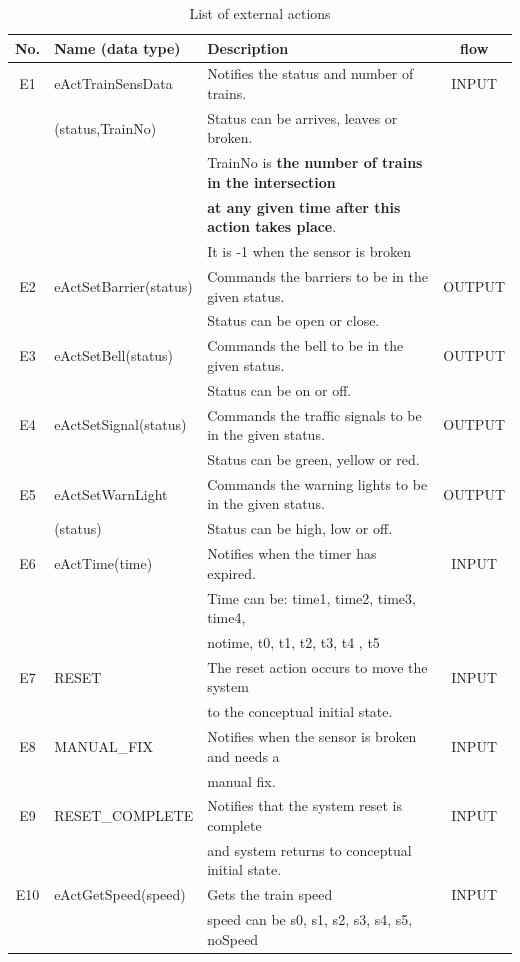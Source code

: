 \documentclass[10pt,a4paper]{article}
\begin{document}
\begin{table}[!hbp]
	\centering
	\begin{adjustwidth}{-1.5cm}{}
	\begin{tabular}{|c|l|l|c|}
		\hline 
		\textbf{No.} & \textbf{Name (data type)
        }&\textbf{Description} & \textbf{flow} \\
		\hline
         E1&eActTrainSensData&Notifies the status and number of trains.&INPUT\\
         &(status,TrainNo)& Status can be arrives, leaves or broken. & \\
         & & TrainNo is \textbf{the number of trains in the intersection} &\\
         && \textbf{at any given time after this action takes place}.&\\ &&It is -1 when the sensor is broken & \\
         \hline
         E2&eActSetBarrier(status)&Commands the barriers to be in the given status.&OUTPUT\\
         &&Status can be open or close.& \\
         \hline
         E3&eActSetBell(status)&Commands the bell to be in the given status.&OUTPUT\\ 
         &&Status can be on or off.&\\
         \hline
         E4&eActSetSignal(status)&Commands the traffic signals to be in the given status.&OUTPUT\\
         &&Status can be green, yellow or red.&\\
         \hline
         E5&eActSetWarnLight&Commands the warning lights to be in the given status.&OUTPUT\\
         &(status)&Status can be high, low or off.&\\
         \hline
         E6&eActTime(time)&Notifies when the timer has expired.&INPUT\\
         &&Time can be: time1, time2, time3, time4, &\\
         &&notime, t0, t1, t2, t3, t4 , t5&\\
         \hline
         E7&RESET&The reset action occurs to move the system&INPUT\\
         &&to the conceptual initial state.&\\
         \hline
         E8&MANUAL\_FIX&Notifies when the sensor is broken and needs a&INPUT\\
         &&manual fix.&\\
         \hline
         E9&RESET\_COMPLETE& Notifies that the system reset is complete&INPUT\\
         &&and system returns to conceptual initial state.&\\
         \hline
         E10&eActGetSpeed(speed)&Gets the train speed  &INPUT\\
         &&speed can be s0, s1, s2, s3, s4, s5, noSpeed&\\   
         \hline
         		\end{tabular}
				\end{adjustwidth}
	\caption{List of external actions}
\end{table}
\end{document}
